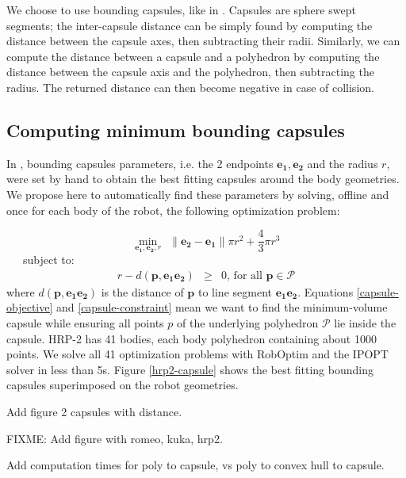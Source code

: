 We choose to use bounding capsules, like in
\cite{Kanoun2011}. Capsules are sphere swept segments; the
inter-capsule distance can be simply found by computing the distance
between the capsule axes, then subtracting their radii. Similarly, we
can compute the distance between a capsule and a polyhedron by
computing the distance between the capsule axis and the polyhedron,
then subtracting the radius. The returned distance can then become
negative in case of collision.

\subsection{Computing minimum bounding capsules}
In \cite{Kanoun2011}, bounding capsules parameters, i.e. the 2
endpoints $\mathbf{e_1}, \mathbf{e_2}$ and the radius $r$, were set by
hand to obtain the best fitting capsules around the body
geometries. We propose here to automatically find these parameters by
solving, offline and once for each body of the robot, the following
optimization problem:

\begin{equation}
  \min_{\mathbf{e_1}, \mathbf{e_2}, r} \ \ 
  \|\mathbf{e_2} - \mathbf{e_1}\| \pi r^2 + \frac{4}{3}\pi r^3
  \label{capsule-objective}
\end{equation}
\ \ \ subject to:
\begin{equation}
  \begin{array}{rcll}
    r - d(\mathbf{p},\mathbf{e_1e_2}) & \ge & 0\mbox{, for all }
    \mathbf{p} \in \mathcal{P}
    \label{capsule-constraint}
  \end{array}
\end{equation} 
where $d(\mathbf{p},\mathbf{e_1e_2})$ is the distance of $\mathbf{p}$
to line segment $\mathbf{e_1e_2}$.  Equations \ref{capsule-objective}
and \ref{capsule-constraint} mean we want to find the minimum-volume
capsule while ensuring all points $p$ of the underlying polyhedron
$\mathcal{P}$ lie inside the capsule. HRP-2 has 41 bodies, each body
polyhedron containing about 1000 points. We solve all 41 optimization
problems with RobOptim \cite{roboptim, moulard2012optimisation} and
the \textsc{IPOPT} solver \cite{Biegler2009} in less than 5s. Figure
\ref{hrp2-capsule} shows the best fitting bounding capsules
superimposed on the robot geometries.

Add figure 2 capsules with distance.

FIXME: Add figure with romeo, kuka, hrp2.

Add computation times for poly to capsule, vs poly to convex hull to
capsule.

